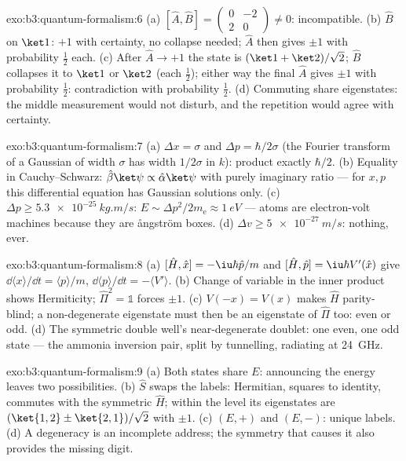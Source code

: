 \begin{solution}{exo:b3:quantum-formalism:6}
(a) $[\hat A, \hat B] = \begin{pmatrix}0 & -2\\ 2 & 0\end{pmatrix}
\neq 0$: incompatible. (b) $\hat B$ on $\ket1$: $+1$ with
certainty, no collapse needed; $\hat A$ then gives $\pm1$ with
probability $\tfrac12$ each. (c) After $\hat A \to +1$ the state is
$(\ket1 + \ket2)/\sqrt2$; $\hat B$ collapses it to $\ket1$ or
$\ket2$ (each $\tfrac12$); either way the final $\hat A$ gives
$\pm1$ with probability $\tfrac12$: contradiction with probability
$\tfrac12$. (d) Commuting  share eigenstates: the middle
measurement would not disturb, and the repetition would agree with
certainty.
\end{solution}

\begin{solution}{exo:b3:quantum-formalism:7}
(a) $\Delta x = \sigma$ and $\Delta p = \hbar/2\sigma$ (the Fourier
transform of a Gaussian of width $\sigma$ has width $1/2\sigma$ in
$k$): product exactly $\hbar/2$. (b) Equality in Cauchy--Schwarz:
$\hat\beta\ket\psi \propto \hat\alpha\ket\psi$ with purely imaginary
ratio --- for $x, p$ this differential equation has Gaussian
solutions only. (c) $\Delta p \ge \qty{5.3e-25}{kg.m/s}$: $E \sim
\Delta p^2/2m_{\text{e}} \approx \qty{1}{eV}$ --- atoms are
electron-volt machines because they are ångström boxes. (d)
$\Delta v \ge \qty{5e-27}{m/s}$: nothing, ever.
\end{solution}

\begin{solution}{exo:b3:quantum-formalism:8}
(a) $[\hat H, \hat x] = -\iu\hbar\hat p/m$ and $[\hat H, \hat p] =
\iu\hbar V'(\hat x)$ give $\dd\langle x\rangle/\dd t = \langle
p\rangle/m$, $\dd\langle p\rangle/\dd t = -\langle V'\rangle$. (b)
Change of variable in the inner product shows Hermiticity;
$\hat\Pi^2 = \mathbb 1$ forces  $\pm1$. (c) $V(-x) =
V(x)$ makes $\hat H$ parity-blind; a non-degenerate eigenstate must
then be an eigenstate of $\hat\Pi$ too: even or odd. (d) The
symmetric double well's near-degenerate doublet: one even, one odd
state --- the ammonia inversion pair, split by tunnelling, radiating
at \qty{24}{GHz}.
\end{solution}

\begin{solution}{exo:b3:quantum-formalism:9}
(a) Both states share $E$: announcing the energy leaves two
possibilities. (b) $\hat S$ swaps the labels: Hermitian, squares to
identity, commutes with the symmetric $\hat H$; within the level its
eigenstates are $(\ket{1,2} \pm \ket{2,1})/\sqrt2$ with 
$\pm1$. (c) $(E, +)$ and $(E, -)$: unique labels. (d) A degeneracy
is an incomplete address; the symmetry that causes it also provides
the missing digit.
\end{solution}

